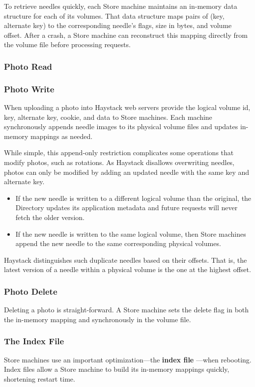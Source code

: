 \documentclass[11pt]{article}
\begin{document}
To retrieve needles quickly, each Store machine maintains an in-memory data structure for each of its
volumes. That data structure maps pairs of (key, alternate key) to the corresponding needle’s flags,
size in bytes, and volume offset. After a crash, a Store machine can reconstruct this mapping directly
from the volume file before processing requests.
\subsubsection{Photo Read}
\label{sec:org249e06c}
\subsubsection{Photo Write}
\label{sec:org3a99f6d}
When uploading a photo into Haystack web servers provide the logical volume id, key, alternate key,
cookie, and data to Store machines. Each machine synchronously appends needle images to its physical
volume files and updates in-memory mappings as needed.

While simple, this append-only restriction complicates some operations that modify photos, such as
rotations. As Haystack disallows overwriting needles, photos can only be modified by adding an updated
needle with the same key and alternate key.
\begin{itemize}
\item If the new needle is written to a different logical volume than the original, the Directory updates
its application metadata and future requests will never fetch the older version.
\item If the new needle is written to the same logical volume, then Store machines append the new needle
to the same corresponding physical volumes.
\end{itemize}

Haystack distinguishes such duplicate needles based on their offsets. That is, the latest version of a
needle within a physical volume is the one at the highest offset.
\subsubsection{Photo Delete}
\label{sec:org3188a1d}
Deleting a photo is straight-forward. A Store machine sets the delete flag in both the in-memory
mapping and synchronously in the volume file.
\subsubsection{The Index File}
\label{sec:orgd17d2cd}
Store machines use an important optimization—the \textbf{index file} —when rebooting.
Index files allow a Store machine to build its in-memory mappings quickly, shortening restart time.
\end{document}
